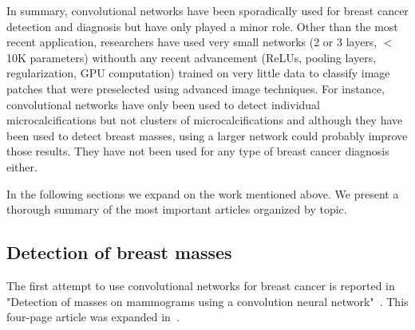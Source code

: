 In summary, convolutional networks have been sporadically used for breast cancer detection and diagnosis but have only played a minor role. Other than the most recent application, researchers have used very small networks (2 or 3 layers, $<$10K parameters) withouth any recent advancement (ReLUs, pooling layers, regularization, GPU computation) trained on very little data to classify image patches that were preselected using advanced image techniques. For instance, convolutional networks have only been used to detect individual microcalcifications but not clusters of microcalcifications and although they have been used to detect breast masses, using a larger network could probably improve those results. They have not been used for any type of breast cancer diagnosis either.


In the following sections we expand on the work mentioned above. We present a thorough summary of the most important articles organized by topic. %

\begin{comment}
Separated in blocks:
	1. Initial mass: Sahiran 1996 (michigan)
	2. Intial microcalc detection: Lo 1995- Lo 1998 (georgetown/both)
	3. Optimal architecture for microcalc: Gurcan 2000-Gurcan 2002 (michigan)
	4. CAD for microcalcification in FFDM. Ge 2007 (CAD for masses didn't use Convnets, used LDA and rule-based classifiers). (michigan)
	5. Late mass diagnosis
\end{comment}

\subsection{Detection of breast masses}
The first attempt to use convolutional networks for breast cancer is reported in "Detection of masses on mammograms using a convolution neural network"~\cite{Wei1995}. This four-page article was expanded in~\cite{Sahiner1996}.


